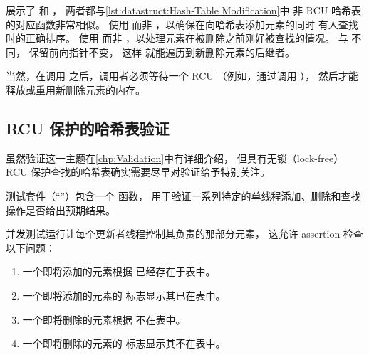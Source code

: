\QuickQuizEnd

\begin{listing}

\caption{RCU 保护的 Hash-Table 修改}
\label{lst:datastruct:RCU-Protected Hash-Table Modification}
\end{listing}

展示了  和 ，
两者都与\cref{lst:datastruct:Hash-Table Modification}中
非 RCU 哈希表的对应函数非常相似。
 使用  而非
，以确保在向哈希表添加元素的同时
有人查找时的正确排序。
 使用  而非
，以处理元素在被删除之前刚好被查找的情况。
与  不同， 保留前向指针不变，
这样  就能遍历到新删除元素的后继者。

当然，在调用  之后，调用者必须等待一个
RCU （例如，通过调用 ），
然后才能释放或重用新删除元素的内存。

\subsection{RCU 保护的哈希表验证}
\label{sec:datastruct:RCU-Protected Hash Table Validation}

虽然验证这一主题在\cref{chp:Validation}中有详细介绍，
但具有无锁（lock-free）RCU 保护查找的哈希表确实需要尽早对验证给予特别关注。

测试套件（``''）包含一个  函数，
用于验证一系列特定的单线程添加、删除和查找操作是否给出预期结果。

并发测试运行让每个更新者线程控制其负责的那部分元素，
这允许 assertion 检查以下问题：

\begin{enumerate}
\item	一个即将添加的元素根据  已经存在于表中。
\item	一个即将添加的元素的  标志显示其已在表中。
\item	一个即将删除的元素根据  不在表中。
\item	一个即将删除的元素的  标志显示其不在表中。
\end{enumerate}

